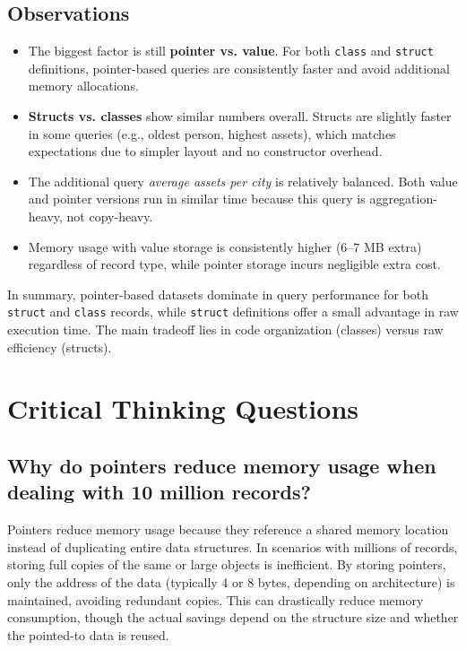 \documentclass[11pt,letterpaper,oneside]{article}
\begin{document}
\subsection{Observations}

\begin{itemize}
    \item The biggest factor is still \textbf{pointer vs. value}. For both
    \texttt{class} and \texttt{struct} definitions, pointer-based queries are
    consistently faster and avoid additional memory allocations.
    \item \textbf{Structs vs. classes} show similar numbers overall. Structs are
    slightly faster in some queries (e.g., oldest person, highest assets), which
    matches expectations due to simpler layout and no constructor overhead.
    \item The additional query \textit{average assets per city} is relatively
    balanced. Both value and pointer versions run in similar time because this
    query is aggregation-heavy, not copy-heavy.
    \item Memory usage with value storage is consistently higher (6–7 MB extra)
    regardless of record type, while pointer storage incurs negligible extra
    cost.
\end{itemize}

In summary, pointer-based datasets dominate in query performance for both
\texttt{struct} and \texttt{class} records, while \texttt{struct} definitions
offer a small advantage in raw execution time. The main tradeoff lies in code
organization (classes) versus raw efficiency (structs).



\section{Critical Thinking Questions}

\subsection{Why do pointers reduce memory usage when dealing with 10 million records?}

Pointers reduce memory usage because they reference a shared memory location
instead of duplicating entire data structures. In scenarios with millions of
records, storing full copies of the same or large objects is inefficient. By
storing pointers, only the address of the data (typically 4 or 8 bytes,
depending on architecture) is maintained, avoiding redundant copies. This can
drastically reduce memory consumption, though the actual savings depend on the
structure size and whether the pointed-to data is reused.
\end{document}
